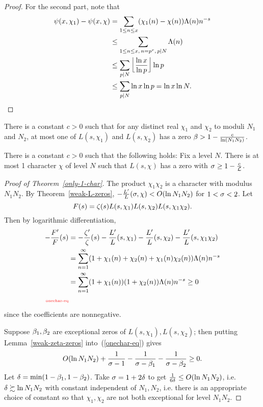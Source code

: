 \begin{proof}
For the second part, note that 
\begin{align*}
\psi(x,\chi_1)-\psi(x,\chi)&=\sum_{1\le n\le x}(\chi_1(n)-\chi(n))\Lambda(n)n^{-s}\\
&\le \sum_{1\le n\le x,\, n=p^r,\, p\mid N}\Lambda(n)\\
&\le \sum_{p\mid N}\left\lfloor\frac{\ln x}{\ln p}\right\rfloor\ln p\\
&\le \sum_{p\mid N}\ln x\ln p=\ln x\ln N.
\qedhere
\end{align*}
\end{proof}
\begin{thm}
There is a constant $c>0$ such that for any distinct real $\chi_1$ and $\chi_2$ to moduli $N_1$ and $N_2$, at most one of $L(s,\chi_1)$ and $L(s,\chi_2)$ has a %
zero $\beta>1-\frac{c}{\ln (N_1N_2)}$. %
\end{thm}
\begin{cor}
There is a constant $c>0$ such that the following holds: 
Fix a level $N$. There is at most 1 character $\chi$ of level $N$ such that $L(s,\chi)$ has a zero with $\sigma\ge 1-\frac{c}{\mathcal{L}}$.
\end{cor}
\begin{proof}[Proof of Theorem~\ref{only-1-char}]
The product $\chi_1\chi_2$ is a character with modulus $N_1N_2$. By Theorem~\ref{weak-L-zeros}, $-\frac{L'}{L}(\sigma,\chi)<O(\ln N_1N_2)$ for $1<\sigma<2$. Let
\[
F(s)=\zeta(s)L(s,\chi_1)L(s,\chi_2)L(s,\chi_1\chi_2).
\]
Then by logarithmic differentiation,
\begin{align}
\nonumber
-\frac{F'}{F}(s)&=-\fc{\ze'}{\ze}(s)-\fc{L'}{L}(s,\chi_1)-\fc{L'}{L}(s,\chi_2)-\fc{L'}{L}(s,\chi_1\chi_2)\\
\nonumber
&
=\sum_{n=1}^{\iy} (1+\chi_1(n)+\chi_2(n)+\chi_1(n)\chi_2(n)) \La(n)n^{-s}\\
&
=\sum_{n=1}^{\iy} (1+\chi_1(n))(1+\chi_2(n)) \La(n)n^{-s}
\ge 0\\
\llabel{onechar-eq}
\end{align}
since the coefficients are nonnegative. 

Suppose $\beta_1,\beta_2$ are exceptional zeros of $L(s,\chi_1), L(s,\chi_2)$; then putting Lemma~\ref{weak-zeta-zeros} into~(\ref{onechar-eq}) gives
\[
O(\ln N_1N_2)+ \frac{1}{\sigma-1}-\frac{1}{\sigma-\beta_1} -\frac{1}{\sigma-\beta_2}\ge 0.
\]
Let $\delta=\min(1-\beta_1,1-\beta_2)$. Take $\sigma=1+2\delta$ to get $\frac{1}{6\delta}\le O(\ln N_1N_2)$, i.e. $\delta\succsim \ln N_1N_2$ with constant independent of $N_1,N_2$, i.e. there is an appropriate choice of constant so that $\chi_1,\chi_2$ are not both exceptional for level $N_1N_2$. 
\end{proof}
